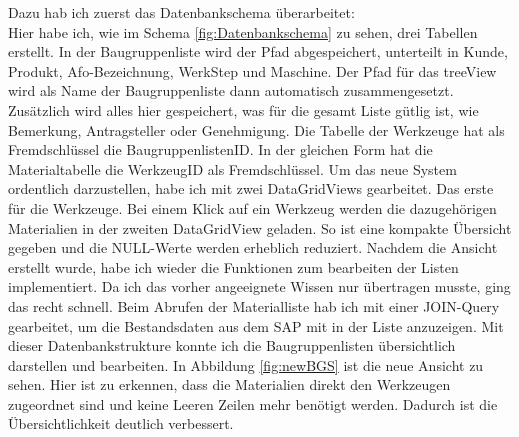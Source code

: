 \documentclass{Vorlage}
\begin{document}
Dazu hab ich zuerst das Datenbankschema überarbeitet:
\\
Hier habe ich, wie im Schema \ref{fig:Datenbankschema} zu
sehen, drei Tabellen erstellt. In der Baugruppenliste wird der Pfad abgespeichert, unterteilt in Kunde, 
Produkt, Afo-Bezeichnung, WerkStep und Maschine. Der Pfad für das treeView wird als Name der Baugruppenliste 
dann automatisch 
zusammengesetzt. Zusätzlich wird alles hier gespeichert, was für die gesamt Liste gütlig ist, 
wie Bemerkung, Antragsteller oder Genehmigung. Die Tabelle der Werkzeuge hat als Fremdschlüssel die 
BaugruppenlistenID. In der gleichen Form hat die Materialtabelle die WerkzeugID als Fremdschlüssel. Um das 
neue System ordentlich darzustellen, habe ich mit zwei DataGridViews gearbeitet. Das erste für die Werkzeuge. 
Bei einem Klick auf ein Werkzeug werden die dazugehörigen Materialien in der zweiten DataGridView
geladen. So ist eine kompakte Übersicht gegeben und die NULL-Werte werden erheblich reduziert. Nachdem die 
Ansicht erstellt wurde, habe ich wieder die Funktionen zum bearbeiten der Listen implementiert. Da ich das 
vorher angeeignete Wissen nur übertragen musste, ging das recht schnell. Beim Abrufen der Materialliste hab 
ich mit einer JOIN-Query gearbeitet, um die Bestandsdaten aus dem SAP mit in der Liste anzuzeigen.
Mit dieser Datenbankstrukture konnte ich die Baugruppenlisten übersichtlich darstellen und bearbeiten.
In Abbildung \ref{fig:newBGS} ist die neue Ansicht zu sehen. Hier ist zu erkennen, dass die Materialien
direkt den Werkzeugen zugeordnet sind und keine Leeren Zeilen mehr benötigt werden. Dadurch ist die
Übersichtlichkeit deutlich verbessert.
\end{document}
